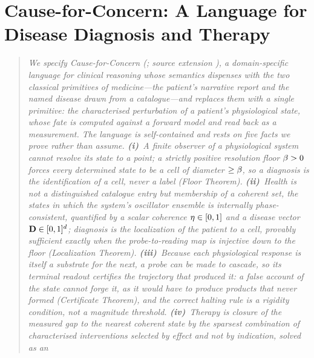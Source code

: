 
\chapter{Cause-for-Concern: A Language for Disease Diagnosis and Therapy}
\label{cfc:ch:cause-for-concern}

\begin{quote}\small\itshape
\noindent
We specify \emph{Cause-for-Concern} (; source extension ),
a domain-specific language for clinical reasoning whose semantics dispenses
with the two classical primitives of medicine---the patient's narrative
report and the named disease drawn from a catalogue---and replaces them with
a single primitive: the \emph{characterised perturbation} of a patient's
physiological state, whose fate is computed against a forward model and read
back as a measurement. The language is self-contained and rests on five facts
we prove rather than assume. \textbf{(i)}~A finite observer of a physiological
system cannot resolve its state to a point; a strictly positive resolution
floor $\beta>0$ forces every determined state to be a \emph{cell} of diameter
$\ge\beta$, so a diagnosis is the identification of a cell, never a label
(\emph{Floor Theorem}). \textbf{(ii)}~Health is not a distinguished catalogue
entry but membership of a \emph{coherent set}, the states in which the
system's oscillator ensemble is internally phase-consistent, quantified by a
scalar coherence $\eta\in[0,1]$ and a disease vector
$\mathbf{D}\in[0,1]^{d}$; diagnosis is the \emph{localization} of the patient to a
cell, provably sufficient exactly when the probe-to-reading map is injective
down to the floor (\emph{Localization Theorem}). \textbf{(iii)}~Because each
physiological response is itself a substrate for the next, a probe can be made
to \emph{cascade}, so its terminal readout \emph{certifies} the trajectory
that produced it: a false account of the state cannot forge it, as it would
have to produce products that never formed (\emph{Certificate Theorem}), and
the correct halting rule is a \emph{rigidity} condition, not a magnitude
threshold. \textbf{(iv)}~Therapy is closure of the measured \emph{gap} to the
nearest coherent state by the sparsest combination of characterised
interventions selected \emph{by effect} and not by indication, solved as an

\end{quote}
